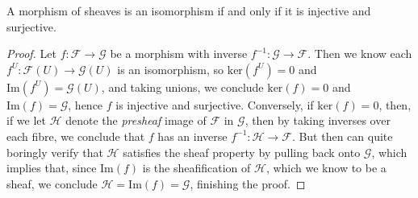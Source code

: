 \begin{theorem}
    A morphism of sheaves is an isomorphism if and only if it is injective and surjective.
\end{theorem}
\begin{proof}
    Let $f: \mathcal{F} \to \mathcal{G}$ be a morphism with inverse $f^{-1}: \mathcal{G} \to \mathcal{F}$. Then we know each $f^U: \mathcal{F}(U) \to \mathcal{G}(U)$ is an isomorphism, so $\text{ker}(f^U) = 0$ and $\text{Im}(f^U) = \mathcal{G}(U)$, and taking unions, we conclude $\text{ker}(f) = 0$ and $\text{Im}(f) = \mathcal{G}$, hence $f$ is injective and surjective. Conversely, if $\text{ker}(f) = 0$, then, if we let $\mathcal{H}$ denote the {\it presheaf} image of $\mathcal{F}$ in $\mathcal{G}$, then by taking inverses over each fibre, we conclude that $f$ has an inverse $f^{-1}: \mathcal{H} \to \mathcal{F}$. But then can quite boringly verify that $\mathcal{H}$ satisfies the sheaf property by pulling back onto $\mathcal{G}$, which implies that, since $\text{Im}(f)$ is the sheafification of $\mathcal{H}$, which we know to be a sheaf, we conclude $\mathcal{H} = \text{Im}(f) = \mathcal{G}$, finishing the proof.
\end{proof}

